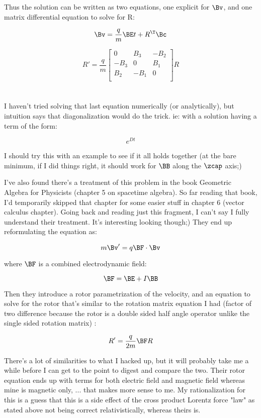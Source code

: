 Thus the solution can be written as two equations, one explicit for $\Bv$, and one matrix differential equation to solve for R:

\[
\Bv = \frac{q}{m} \BE t + R^\T \Bc
\]

\[
R' = \frac{q}{m}
\begin{bmatrix}
0 & B_3 & -B_2 \\
-B_3 & 0 & B_1 \\
B_2 & -B_1 & 0 \\
\end{bmatrix}
R
\]

\section{}

I haven't tried solving that last equation numerically (or analytically), but intuition says that diagonalization would do the trick.  ie: with a solution having a term of the form:

\[
e^{Dt}
\]

I should try this with an example to see if it all holds together (at the bare minimum, if I did things right, it should work for $\BB$ along the $\zcap$ axis;)

I've also found there's a treatment of this problem in the book Geometric Algebra for Physicists (chapter 5 on spacetime algebra).  So far reading that book, I'd temporarily skipped that chapter for some easier stuff in chapter 6 (vector calculus chapter).  Going back and reading just this fragment, I can't say I fully understand their treatment.  It's interesting looking though;)  They end up reformulating the equation as:

\[
m \Bv' = q \BF \cdot \Bv
\]

where $\BF$ is a combined electrodynamic field:

\[
\BF = \BE + I \BB
\]

Then they introduce a rotor parametrization of the velocity, and an equation to solve for the rotor that's similar to the rotation matrix equation I had (factor of two difference because the rotor is a double sided half angle operator unlike the single sided rotation matrix) :

\[
R' = \frac{q}{2m} \BF R
\]

There's a lot of similarities to what I hacked up, but it will probably take me a while before I can get to the point to digest and compare the two.   Their rotor equation ends up with terms for both electric field and magnetic field whereas mine is magnetic only, ... that makes more sense to me.  My rationalization for this is a guess that this is a side effect of the cross product Lorentz force "law" as stated above not being correct relativistically, whereas theirs is.

